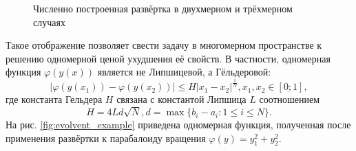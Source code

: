 \begin{figure}[ht]
    \centering
    \qquad
    \caption{Численно построенная развёртка в двухмерном и трёхмерном случаях}
    \label{fig:peano_curve}
\end{figure}

Такое отображение позволяет свести задачу в многомерном пространстве к решению
одномерной ценой ухудшения её свойств. В частности, одномерная функция \(\varphi(y(x))\)
является не Липшицевой, а Гёльдеровой:
\begin{displaymath}
\label{holder}
|\varphi(y(x_1))-\varphi(y(x_2))|\leqslant H{|x_1-x_2|}^{\frac{1}{N}},x_1,x_2\in[0;1],
\end{displaymath}
где константа Гельдера \(H\) связана с константой Липшица \(L\) соотношением
\begin{displaymath}
H=4Ld\sqrt{N},d=\max\{b_i-a_i:1\leqslant i\leqslant N\}.
\end{displaymath}
На рис. \ref{fig:evolvent_example} приведена одномерная функция, полученная после применения развёртки к
парабалоиду вращения \(\varphi(y)=y_1^2+y_2^2\).

